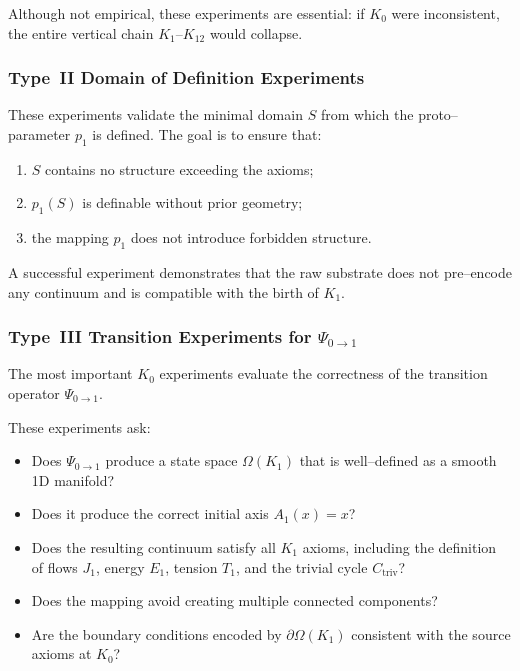 Although not empirical, these experiments are essential:  
if $K_0$ were inconsistent, the entire vertical chain $K_1$–$K_{12}$ would
collapse.


\subsubsection{Type~II Domain of Definition Experiments}

These experiments validate the minimal domain $S$ from which the
proto–parameter $p_1$ is defined.  
The goal is to ensure that:

\begin{enumerate}
    \item $S$ contains no structure exceeding the axioms;
    \item $p_1(S)$ is definable without prior geometry;
    \item the mapping $p_1$ does not introduce forbidden structure.
\end{enumerate}

A successful experiment demonstrates that the raw substrate does not
pre–encode any continuum and is compatible with the birth of $K_1$.


\subsubsection{Type~III Transition Experiments for $\Psi_{0\to 1}$}

The most important $K_0$ experiments evaluate the correctness of the
transition operator $\Psi_{0\to 1}$.

These experiments ask:
\begin{itemize}
    \item Does $\Psi_{0\to 1}$ produce a state space $\Omega(K_1)$ that is
          well–defined as a smooth 1D manifold?
    \item Does it produce the correct initial axis $A_1(x)=x$?
    \item Does the resulting continuum satisfy all $K_1$ axioms, including
          the definition of flows $J_1$, energy $E_1$, tension $T_1$, and
          the trivial cycle $C_{\mathrm{triv}}$?
    \item Does the mapping avoid creating multiple connected components?
    \item Are the boundary conditions encoded by $\partial\Omega(K_1)$
          consistent with the source axioms at $K_0$?
\end{itemize}

